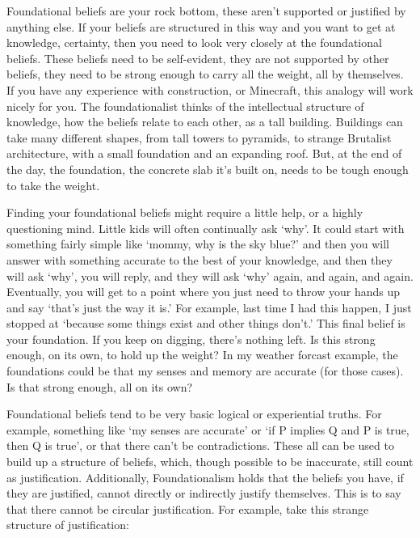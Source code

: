 Foundational beliefs are your rock bottom, these aren't supported or justified by anything else. If your beliefs are structured in this way and you want to get at knowledge, certainty, then you need to look very closely at the foundational beliefs. These beliefs need to be self-evident, they are not  supported by other beliefs, they need to be strong enough to carry all the weight, all by themselves.  If you have any experience with construction, or Minecraft, this analogy will work nicely for you. The foundationalist thinks of the intellectual structure of knowledge, how the beliefs relate to each other, as a tall building. Buildings can take many different shapes, from tall towers to pyramids, to strange Brutalist architecture, with a small foundation and an expanding roof. But, at the end of the day, the foundation, the concrete slab it's built on, needs to be tough enough to take the weight. 

Finding your foundational beliefs might require a little help, or a highly questioning mind. Little kids will often continually ask `why'. It could start with something fairly simple like `mommy, why is the sky blue?' and then you will answer with something accurate to the best of your knowledge, and then they will ask `why', you will reply, and they will ask `why' again, and again, and again. Eventually, you will get to a point where you just need to throw your hands up and say `that's just the way it is.' For example, last time I had this happen, I just stopped at `because some things exist and other things don't.' This final belief is your foundation. If you keep on digging, there's nothing left. Is this strong enough, on its own, to hold up the weight? In my weather forcast example, the foundations could be that my senses and memory are accurate (for those cases). Is that strong enough, all on its own? 

Foundational beliefs tend to be very basic logical or experiential truths. For example, something like `my senses are accurate' or `if P implies Q and P is true, then Q is true', or that there can't be contradictions. These all can be used to build up a structure of beliefs, which, though possible to be inaccurate, still count as justification. Additionally, Foundationalism holds that the beliefs you have, if they are justified, cannot directly or indirectly justify themselves. This is to say that there cannot be circular justification. For example, take this strange structure of justification:


